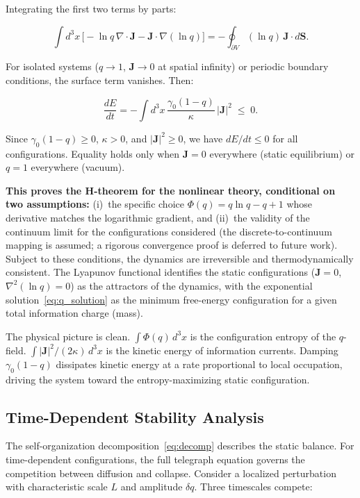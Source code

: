 \documentclass[aps,prd,twocolumn,showpacs,superscriptaddress,preprintnumbers]{revtex4-2}
\begin{document}
Integrating the first two terms by parts:

\begin{equation}
\int d^3x\,\bigl[-\ln q\,\nabla\cdot\mathbf{J} - \mathbf{J}\cdot\nabla(\ln q)\bigr] = -\oint_{\partial V} (\ln q)\,\mathbf{J}\cdot d\mathbf{S}.
\label{eq:boundary_term}
\end{equation}

For isolated systems ($q\to1$, $\mathbf{J}\to0$ at spatial infinity) or periodic boundary conditions, the surface term vanishes.
Then:

\begin{equation}
\boxed{\frac{dE}{dt} = -\int d^3x\,\frac{\gamma_0(1-q)}{\kappa}\,|\mathbf{J}|^2 \;\leq\; 0}.
\label{eq:dEdt_final}
\end{equation}

Since $\gamma_0(1-q)\geq0$, $\kappa>0$, and $|\mathbf{J}|^2\geq0$, we have $dE/dt\leq0$ for all configurations.
Equality holds only when $\mathbf{J}=0$ everywhere (static equilibrium) or $q=1$ everywhere (vacuum).

\textbf{This proves the H-theorem for the nonlinear theory, conditional on two assumptions:} (i)~the specific choice $\Phi(q)=q\ln q - q + 1$ whose derivative matches the logarithmic gradient, and (ii)~the validity of the continuum limit for the configurations considered (the discrete-to-continuum mapping is assumed; a rigorous convergence proof is deferred to future work). Subject to these conditions, the dynamics are irreversible and thermodynamically consistent.
The Lyapunov functional identifies the static configurations ($\mathbf{J}=0$, $\nabla^2(\ln q)=0$) as the attractors of the dynamics, with the exponential solution~\eqref{eq:q_solution} as the minimum free-energy configuration for a given total information charge (mass).

The physical picture is clean.
$\int\Phi(q)\,d^3x$ is the configuration entropy of the $q$-field.
$\int|\mathbf{J}|^2/(2\kappa)\,d^3x$ is the kinetic energy of information currents.
Damping $\gamma_0(1-q)$ dissipates kinetic energy at a rate proportional to local occupation, driving the system toward the entropy-maximizing static configuration.

\subsection{Time-Dependent Stability Analysis}
\label{sec:stability}

The self-organization decomposition~\eqref{eq:decomp} describes the static balance.
For time-dependent configurations, the full telegraph equation governs the competition between diffusion and collapse.
Consider a localized perturbation with characteristic scale $L$ and amplitude $\delta q$.
Three timescales compete:
\end{document}
